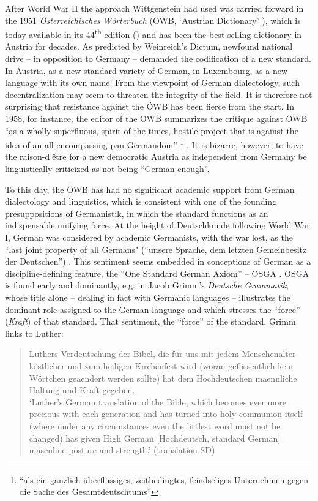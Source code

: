 \documentclass[output=paper]{langscibook}
\begin{document}
After World War II the approach Wittgenstein had used was carried forward in the 1951 \textit{Österreichisches Wörterbuch} (ÖWB, `Austrian Dictionary' \citeyear{ÖWB1951}), which is today available in its 44\textsuperscript{th} edition (\citeyear{Pabst2022}) and has been the best-selling dictionary in Austria for decades. As predicted by Weinreich’s Dictum, newfound national drive – in opposition to Germany – demanded the codification of a new standard. In Austria, as a new standard variety of German, in Luxembourg, as a new language with its own name. From the viewpoint of German dialectology, such decentralization may seem to threaten the integrity of the field. It is therefore not surprising that resistance against the ÖWB has been fierce from the start. In 1958, for instance, the editor of the ÖWB summarizes the critique against ÖWB “as a wholly superfluous, spirit-of-the-times, hostile project that is against the idea of an all-encompassing pan-Germandom” \footnote{{} ``als ein gänzlich überflüssiges, zeitbedingtes, feindseliges Unternehmen gegen die Sache des Gesamtdeutschtums''} \citep[156]{Krassnigg1958}. It is bizarre, however, to have the raison-d’être for a new democratic Austria as independent from Germany be linguistically criticized as not being “German enough”.

To this day, the ÖWB has had no significant academic support from German dialectology and linguistics, which is consistent with one of the founding presuppositions of Germanistik, in which the standard functions as an indispensable unifying force. At the height of Deutschkunde following World War I, German was considered by academic Germanists, with the war lost, as the ``last joint property of all Germans" (``unsere Sprache, dem letzten Gemeinbesitz der Deutschen'') \citep[415]{Petersen1924}. This sentiment seems embedded in conceptions of German as a discipline-defining feature, the “One Standard German Axiom” – OSGA \citep[14]{Dollinger2019c}. OSGA is found early and dominantly, e.g. in Jacob Grimm’s \textit{Deutsche Grammatik}, whose title alone – dealing in fact with Germanic languages – illustrates the dominant role assigned to the German language and which stresses the “force” (\textit{Kraft}) of that standard. That sentiment, the ``force'' of the standard, Grimm links to Luther:

\begin{quote}
\foreignlanguage{ngerman}{%
Luthers Verdeutschung der Bibel, die für uns mit jedem Menschenalter köstlicher und zum heiligen Kirchenfest wird (woran geflissentlich kein Wörtchen geaendert werden sollte) hat dem Hochdeutschen maennliche Haltung und Kraft gegeben. \citep[6]{Grimm1819}
}\medskip\\
`Luther’s German translation of the Bible, which becomes ever more precious with each generation and has turned into holy communion itself (where under any circumstances even the littlest word must not be changed) has given High German [Hochdeutsch, standard German] masculine posture and strength.' (translation SD)
\end{quote}
\end{document}
